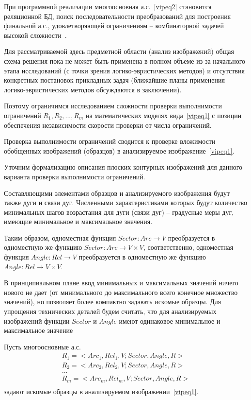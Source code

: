 При программной реализации многоосновная а.с.~\ref{vipeq2} становится реляционной БД, поиск последовательности преобразований для построения финальной а.с., удовлетворяющей ограничениям – комбинаторной задачей высокой сложности~\cite{4}.

Для рассматриваемой здесь предметной области (анализ изображений) общая схема решения пока не может быть применена в полном объеме из-за начального этапа исследований (с точки зрения логико-эвристических методов) и отсутствия конкретных постановок прикладных задач (ближайшие планы применения логико-эвристических методов обсуждаются в заключении).

Поэтому ограничимся исследованием сложности проверки выполнимости ограничений $R_1,R_2,...,R_m$ на математических моделях вида~\ref{vipeq1} с позиции обеспечения независимости скорости проверки от числа ограничений.

Проверка выполнимости ограничений сводится к проверке вложимости обобщенных изображений (образцов) в анализируемое изображение~\ref{vipeq1}. 

Уточним формализацию описания плоских контурных изображений для данного варианта проверки выполнимости ограничений.

Составляющими элементами образцов и анализируемого изображения будут также дуги и связи дуг. Численными характеристиками которых будут количество минимальных шагов возрастания для дуги (связи дуг) -- градусные меры дуг, имеющие минимальное и максимальное значения.

Таким образом, одноместная функция $Sector: Arc \rightarrow V$ преобразуется в одноместную же функцию $Sector: Arc \rightarrow V \times V$, соответственно, одноместная функция $Angle: Rel \rightarrow V$ преобразуется в одноместную же функцию $Angle: Rel \rightarrow V \times V$.

\begin{remark}
В принципиальном плане ввод минимальных и максимальных значений ничего нового не дает (от минимального до максимального всего конечное множество значений), но позволяет более компактно задавать искомые образцы. Для упрощения технических деталей будем считать, что для анализируемых изображений функции $Sector$ и $Angle$ имеют одинаковое минимальное и максимальное значение
\end{remark}

Пусть многоосновные а.с.
\begin{equation}
	\begin{array}{c}
	R_1=<Arc_1, Rel_1, V; Sector, Angle, R> \\
	R_2=<Arc_2, Rel_2, V; Sector, Angle, R> \\
	\dots\\
	R_m=<Arc_m, Rel_m, V; Sector, Angle, R> \\
	\end{array}
	\label{vipeq3}
\end{equation}
задают искомые образцы в анализируемом изображении~\ref{vipeq1}.

